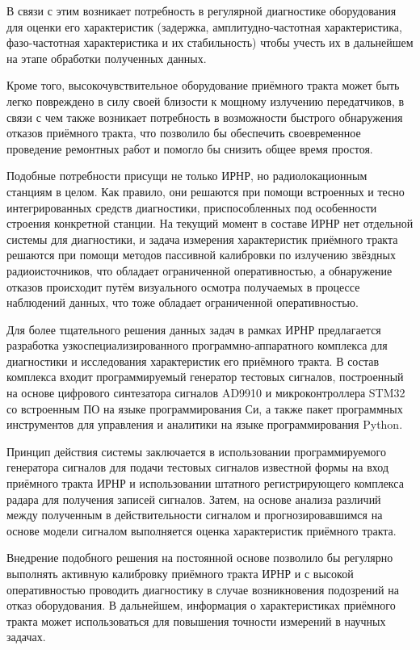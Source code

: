 \documentclass{report}
\begin{document}
В связи с этим возникает потребность в регулярной диагностике оборудования для оценки его характеристик (задержка, амплитудно-частотная характеристика, фазо-частотная характеристика и их стабильность) чтобы учесть их в дальнейшем на этапе обработки полученных данных.

Кроме того, высокочувствительное оборудование приёмного тракта может быть легко повреждено в силу своей близости к мощному излучению передатчиков, в связи с чем также возникает потребность в возможности быстрого обнаружения отказов приёмного тракта, что позволило бы обеспечить своевременное проведение ремонтных работ и помогло бы снизить общее время простоя.

Подобные потребности присущи не только ИРНР, но радиолокационным станциям в целом. Как правило, они решаются при помощи встроенных и тесно интегрированных средств диагностики, приспособленных под особенности строения конкретной станции. На текущий момент в составе ИРНР нет отдельной системы для диагностики, и задача измерения характеристик приёмного тракта решаются при помощи методов пассивной калибровки по излучению звёздных радиоисточников, что обладает ограниченной оперативностью, а обнаружение отказов происходит путём визуального осмотра получаемых в процессе наблюдений данных, что тоже обладает ограниченной оперативностью.

Для более тщательного решения данных задач в рамках ИРНР предлагается разработка узкоспециализированного программно-аппаратного комплекса для диагностики и исследования характеристик его приёмного тракта. В состав комплекса входит программируемый генератор тестовых сигналов, построенный на основе цифрового синтезатора сигналов AD9910 и микроконтроллера STM32 со встроенным ПО на языке программирования Си, а также пакет программных инструментов для управления и аналитики на языке программирования Python.

Принцип действия системы заключается в использовании программируемого генератора сигналов для подачи тестовых сигналов известной формы на вход приёмного тракта ИРНР и использовании штатного регистрирующего комплекса радара для получения записей сигналов. Затем, на основе анализа различий между полученным в действительности сигналом и прогнозировавшимся на основе модели сигналом выполняется оценка характеристик приёмного тракта.

Внедрение подобного решения на постоянной основе позволило бы регулярно выполнять активную калибровку приёмного тракта ИРНР и с высокой оперативностью проводить диагностику в случае возникновения подозрений на отказ оборудования. В дальнейшем, информация о характеристиках приёмного тракта может использоваться для повышения точности измерений в научных задачах.
\end{document}
